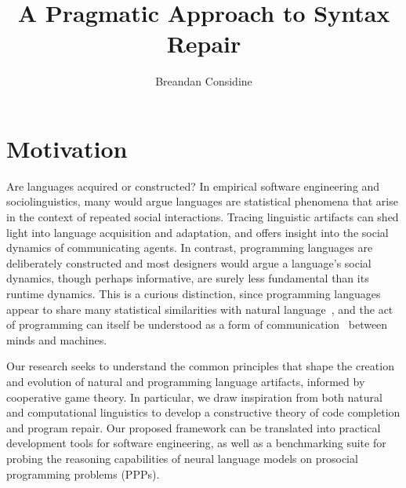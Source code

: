 \documentclass[sigplan,screen]{acmart}
\begin{document}
\title{A Pragmatic Approach to Syntax Repair}

\author{Breandan Considine}

\renewcommand{\shortauthors}{Breandan Considine}


\maketitle

\section{Motivation}


Are languages acquired or constructed? In empirical software engineering and sociolinguistics, many would argue languages are statistical phenomena that arise in the context of repeated social interactions. Tracing linguistic artifacts can shed light into language acquisition and adaptation, and offers insight into the social dynamics of communicating agents. In contrast, programming languages are deliberately constructed and most designers would argue a language's social dynamics, though perhaps informative, are surely less fundamental than its runtime dynamics. This is a curious distinction, since programming languages appear to share many statistical similarities with natural language~\cite{hindle2016naturalness}, and the act of programming can itself be understood as a form of communication~\cite{demillo1979social} between minds and machines.

Our research seeks to understand the common principles that shape the creation and evolution of natural and programming language artifacts, informed by cooperative game theory. In particular, we draw inspiration from both natural and computational linguistics to develop a constructive theory of code completion and program repair. Our proposed framework can be translated into practical development tools for software engineering, as well as a benchmarking suite for probing the reasoning capabilities of neural language models on prosocial programming problems (PPPs).
\end{document}
